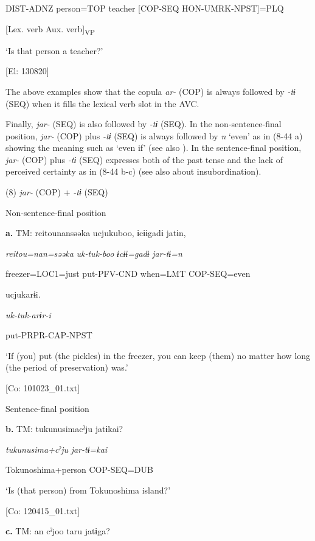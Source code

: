       DIST-ADNZ  person=TOP  teacher  [COP-SEQ  HON-UMRK-NPST]=PLQ

            [Lex. verb  Aux. verb]\textsubscript{VP}

      ‘Is that person a teacher?’

      [El: 130820]

The above examples show that the copula \textit{ar-} (COP) is always followed by \textit{{}-tɨ} (SEQ) when it fills the lexical verb slot in the AVC.

  Finally, \textit{jar-} (SEQ) is also followed by \textit{{}-tɨ} (SEQ). In the non-sentence-final position, \textit{jar-} (COP) plus \textit{{}-tɨ} (SEQ) is always followed by \textit{n} ‘even’ as in (8-44 a) showing the meaning such as ‘even if’ (see also ). In the sentence-final position, \textit{jar-} (COP) plus \textit{{}-tɨ} (SEQ) expresses both of the past tense and the lack of perceived certainty as in (8-44 b-c) (see also  about insubordination).

(8)  \textit{jar-} (COP) + \textit{{}-tɨ} (SEQ)

  Non-sentence-final position

  \textbf{a.}  TM:  {\textbar}reitou{\textbar}nansəəka  ucjukuboo,  ɨcɨɨgadɨ  jatɨn,

      \textit{reitou=nan=səəka}  \textit{uk-tuk-boo}  \textit{ɨcɨɨ=gadɨ}  \textit{jar-tɨ=n}

      freezer=LOC1=just  put-PFV-CND  when=LMT  COP-SEQ=even

      ucjukarɨi.

      \textit{uk-tuk-arɨr-i}

      put-PRPR-CAP-NPST

      ‘If (you) put (the pickles) in the freezer, you can keep (them) no matter how long (the period of preservation) was.’

      [Co: 101023\_01.txt]

  Sentence-final position

  \textbf{b.}  TM:  tukunusimacˀju  jatɨkai?

      \textit{tukunusima+cˀju}  \textit{jar-tɨ=kai}

      Tokunoshima+person  COP-SEQ=DUB

      ‘Is (that person) from Tokunoshima island?’

      [Co: 120415\_01.txt]

  \textbf{c.}  TM:  an  cˀjoo  taru  jatɨga?

